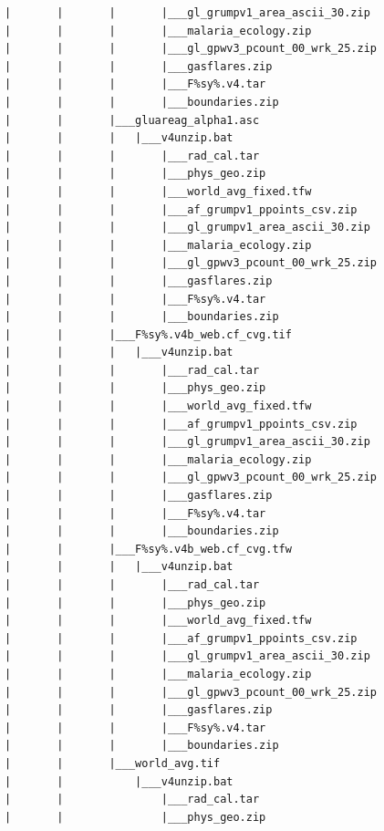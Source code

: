 \documentclass[
]{book}
\begin{document}
\begin{verbatim}
            |       |       |       |___gl_grumpv1_area_ascii_30.zip
            |       |       |       |___malaria_ecology.zip
            |       |       |       |___gl_gpwv3_pcount_00_wrk_25.zip
            |       |       |       |___gasflares.zip
            |       |       |       |___F%sy%.v4.tar
            |       |       |       |___boundaries.zip
            |       |       |___gluareag_alpha1.asc
            |       |       |   |___v4unzip.bat
            |       |       |       |___rad_cal.tar
            |       |       |       |___phys_geo.zip
            |       |       |       |___world_avg_fixed.tfw
            |       |       |       |___af_grumpv1_ppoints_csv.zip
            |       |       |       |___gl_grumpv1_area_ascii_30.zip
            |       |       |       |___malaria_ecology.zip
            |       |       |       |___gl_gpwv3_pcount_00_wrk_25.zip
            |       |       |       |___gasflares.zip
            |       |       |       |___F%sy%.v4.tar
            |       |       |       |___boundaries.zip
            |       |       |___F%sy%.v4b_web.cf_cvg.tif
            |       |       |   |___v4unzip.bat
            |       |       |       |___rad_cal.tar
            |       |       |       |___phys_geo.zip
            |       |       |       |___world_avg_fixed.tfw
            |       |       |       |___af_grumpv1_ppoints_csv.zip
            |       |       |       |___gl_grumpv1_area_ascii_30.zip
            |       |       |       |___malaria_ecology.zip
            |       |       |       |___gl_gpwv3_pcount_00_wrk_25.zip
            |       |       |       |___gasflares.zip
            |       |       |       |___F%sy%.v4.tar
            |       |       |       |___boundaries.zip
            |       |       |___F%sy%.v4b_web.cf_cvg.tfw
            |       |       |   |___v4unzip.bat
            |       |       |       |___rad_cal.tar
            |       |       |       |___phys_geo.zip
            |       |       |       |___world_avg_fixed.tfw
            |       |       |       |___af_grumpv1_ppoints_csv.zip
            |       |       |       |___gl_grumpv1_area_ascii_30.zip
            |       |       |       |___malaria_ecology.zip
            |       |       |       |___gl_gpwv3_pcount_00_wrk_25.zip
            |       |       |       |___gasflares.zip
            |       |       |       |___F%sy%.v4.tar
            |       |       |       |___boundaries.zip
            |       |       |___world_avg.tif
            |       |           |___v4unzip.bat
            |       |               |___rad_cal.tar
            |       |               |___phys_geo.zip

\end{verbatim}
\end{document}
